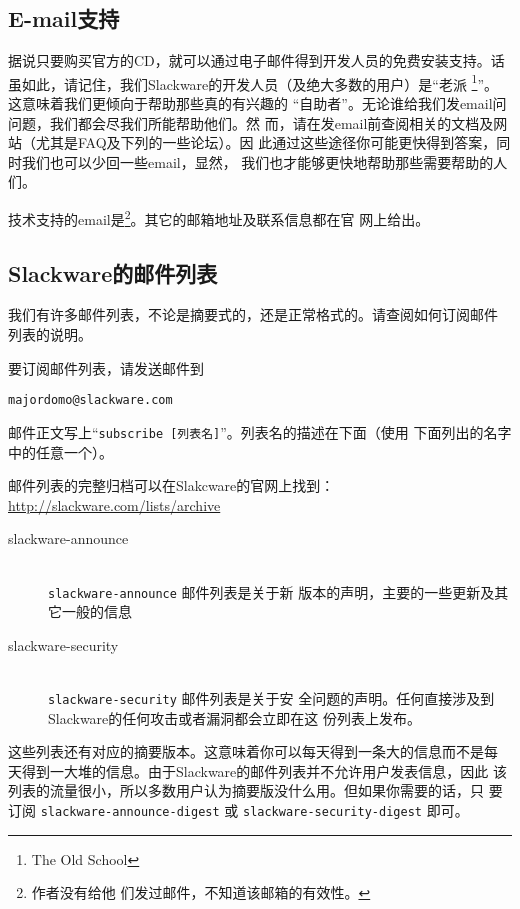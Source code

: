 \subsection{E-mail支持}
\label{sec:help:onlineHelp:emailSupport}

据说只要购买官方的CD，就可以通过电子邮件得到开发人员的免费安装支持。话
虽如此，请记住，我们Slackware的开发人员（及绝大多数的用户）是``老派
\footnote{The Old School}''。这意味着我们更倾向于帮助那些真的有兴趣的
``自助者''。无论谁给我们发email问问题，我们都会尽我们所能帮助他们。然
而，请在发email前查阅相关的文档及网站（尤其是FAQ及下列的一些论坛）。因
此通过这些途径你可能更快得到答案，同时我们也可以少回一些email，显然，
我们也才能够更快地帮助那些需要帮助的人们。

技术支持的email是\footnote{作者没有给他
  们发过邮件，不知道该邮箱的有效性。}。其它的邮箱地址及联系信息都在官
网上给出。

\subsection{Slackware的邮件列表}
\label{sec:help:onlineHelp:mailingLists}

我们有许多邮件列表，不论是摘要式的，还是正常格式的。请查阅如何订阅邮件
列表的说明。

要订阅邮件列表，请发送邮件到
\begin{verbatim}
majordomo@slackware.com
\end{verbatim}
邮件正文写上``\texttt{subscribe [列表名]}''。列表名的描述在下面（使用
下面列出的名字中的任意一个）。

邮件列表的完整归档可以在Slakcware的官网上找到：
\url{http://slackware.com/lists/archive}

\begin{description}
\item[slackware-announce] \hfill \\
 \texttt{slackware-announce} 邮件列表是关于新
  版本的声明，主要的一些更新及其它一般的信息
\item[slackware-security] \hfill \\
  \texttt{slackware-security} 邮件列表是关于安
  全问题的声明。任何直接涉及到Slackware的任何攻击或者漏洞都会立即在这
  份列表上发布。
\end{description}
这些列表还有对应的摘要版本。这意味着你可以每天得到一条大的信息而不是每
天得到一大堆的信息。由于Slackware的邮件列表并不允许用户发表信息，因此
该列表的流量很小，所以多数用户认为摘要版没什么用。但如果你需要的话，只
要订阅 \texttt{slackware-announce-digest} 或
\texttt{slackware-security-digest} 即可。

